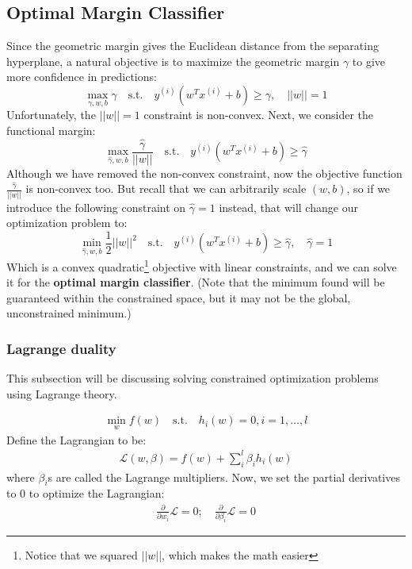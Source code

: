 \documentclass[letterpaper,10pt]{article}
\begin{document}
\subsection{Optimal Margin Classifier}
Since the geometric margin gives the Euclidean distance from the separating hyperplane, a natural objective is to maximize the geometric margin $\gamma$ to give more confidence in predictions:
\begin{equation}
\max_{\gamma, w, b} \gamma \quad \text{s.t.} \quad y^{(i)}(w^Tx^{(i)} + b) \geq \gamma, \quad ||w||=1
\end{equation}
Unfortunately, the $||w||=1$ constraint is non-convex. Next, we consider the functional margin:
\begin{equation}
\max_{\hat \gamma, w, b} \frac{\hat \gamma}{||w||} \quad \text{s.t.} \quad y^{(i)}(w^Tx^{(i)} + b) \geq \hat \gamma
\end{equation}
Although we have removed the non-convex constraint, now the objective function $\frac{\hat \gamma}{||w||}$ is non-convex too. But recall that we can arbitrarily scale $(w,b)$, so if we introduce the following constraint on $\hat \gamma = 1$ instead, that will change our optimization problem to:
\begin{equation}
\min_{\hat \gamma, w, b} \frac{1}{2}||w||^2 \quad \text{s.t.} \quad y^{(i)}(w^Tx^{(i)} + b) \geq \hat \gamma, \quad \hat \gamma = 1
\end{equation}
Which is a convex quadratic\footnote{Notice that we squared $||w||$, which makes the math easier} objective with linear constraints, and we can solve it for the \textbf{optimal margin classifier}. (Note that the minimum found will be guaranteed within the constrained space, but it may not be the global, unconstrained minimum.)

\subsubsection{Lagrange duality}

This subsection will be discussing solving constrained optimization problems using Lagrange theory.

\begin{align}
\min_w f(w) \quad \text{s.t.} \quad h_i(w)=0, i=1,\ldots,l
\end{align}
Define the Lagrangian to be:
\begin{align}
\mathcal{L}(w,\beta) = f(w) + \sum_{i}^l \beta_i h_i(w)
\end{align}
where $\beta_i$s are called the Lagrange multipliers. Now, we set the partial derivatives to 0 to optimize the Lagrangian:
\begin{align}
\frac{\partial}{\partial w_i} \mathcal{L}=0;\quad \frac{\partial}{\partial \beta_i} \mathcal{L}=0
\end{align}
\end{document}
